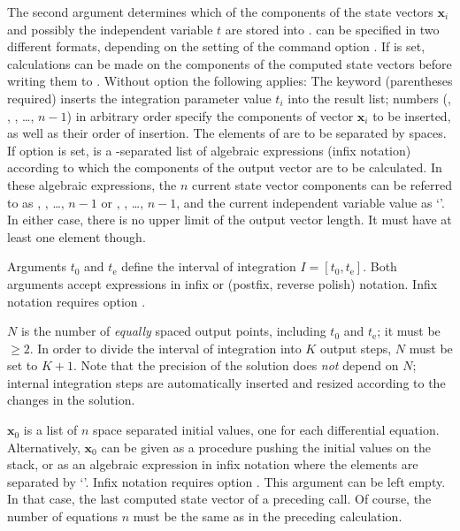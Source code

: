 \documentclass[11pt,english,BCOR10mm,DIV12,bibliography=totoc,parskip=false,smallheadings
    headexclude,footexclude,oneside,dvips,UKenglish]{pst-doc}
\begin{document}
The second argument  determines which of the components of the state vectors $\mathbf{x}_i$ and possibly the independent variable $t$ are stored into .  can be specified in two different formats, depending on the setting of the command option .
If  is set, calculations can be made on the components of the computed state vectors before writing them to . Without option  the following applies: The keyword  (parentheses required) inserts the integration parameter value $t_i$ into the result list; numbers (, , , \dots, $n-1$) in arbitrary order specify the components of vector $\mathbf{x}_i$ to be inserted, as well as their order of insertion. The elements of  are to be separated by spaces. If option  is set,  is a \Lkeyword{|}-separated list of algebraic expressions (infix notation) according to which the components of the output vector are to be calculated. In these algebraic expressions, the $n$ current state vector components can be referred to as , , \dots, \Lkeyword{x[}$n-1$\Lkeyword{]} or , , \dots, \Lkeyword{y[}$n-1$\Lkeyword{]}, and the current independent variable value as `'. In either case, there is no upper limit of the output vector length. It must have at least one element though.

Arguments $t_0$ and $t_\mathrm{e}$ define the interval of integration $I=[t_0, t_\mathrm{e}]$. Both arguments accept expressions in infix or \PS{} (postfix, reverse polish) notation. Infix notation requires option .

$N$ is the number of \emph{equally} spaced output points, including $t_0$ and $t_\mathrm{e}$; it must be $\ge 2$. In order to divide the interval of integration into $K$ output steps, $N$ must be set to $K+1$. Note that the precision of the solution does \emph{not} depend on $N$; internal integration steps are automatically inserted and resized according to the changes in the solution.

$\mathbf{x}_0$ is a list of $n$ space separated initial values, one for each differential equation. Alternatively, $\mathbf{x}_0$ can be given as a \PS{} procedure pushing the initial values on the stack, or as an algebraic expression in infix notation where the elements are separated by `\Lkeyword{|}'. Infix notation requires option . This argument can be left empty. In that case, the last computed state vector of a preceding  call. Of course, the number of equations $n$ must be the same as in the preceding calculation.
\end{document}
